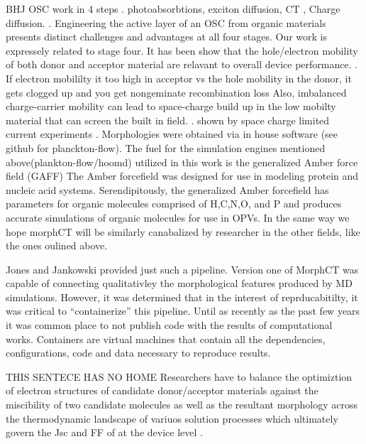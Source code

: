 BHJ OSC work in 4 steps . photoabsorbtions, exciton diffusion, CT , Charge diffusion. \citet{Fusella2019}.
Engineering the active layer of an OSC from organic materials presents distinct challenges and advantages at
all four stages. 
\indent Our work is expressely related to stage four. It has been show that the hole/electron mobility of both donor and acceptor material are
relavant to overall device performance. \cite{Wang2019e}. If electron mobililty it too high
in acceptor vs the hole mobility in the donor, it gets clogged up and you get nongeminate recombination loss
Also, imbalanced charge-carrier mobility can lead to space-charge build up in the low mobilty material that
can screen the built in field.  \cite{Bartelt2015}. shown by space charge limited current experiments
\cite{Small2013}.
Morphologies were obtained via in house software (see github for planckton-flow).  The
fuel for the simulation engines mentioned above(plankton-flow/hoomd) utilized in this work is the generalized
Amber force field (GAFF)\cite{Wang2004a} The Amber forcefield was designed for use in modeling protein and
nucleic acid systems.  Serendipitously, the generalized Amber forcefield has parameters for organic molecules
comprised of H,C,N,O, and P and produces accurate simulations of organic molecules for use in OPVs. In the
same way we hope morphCT will be similarly canabalized by researcher in the other fields, like the ones oulined above. 


\indent Jones and Jankowski provided just such a pipeline. Version one of MorphCT was capable of
connecting qualitativley the morphological features produced by MD simulations. However, it was determined
that in the interest of reprducabitilty, it was critical to ``containerize'' this pipeline. Until as recently as
the past few years it was common place to not publish code with the results of computational works. Containers
are virtual machines that contain all the dependencies, configurations, code and data necessary to reproduce
results. \cite{Cito2016a}

THIS SENTECE HAS NO HOME Researchers have to
balance the optimiztion of electron structures of candidate donor/acceptor materials against the miscibility
of two candidate molecules as well as the resultant morphology across the thermodynamic landscape of
variuos solution processes which ultimately govern the Jsc and FF of at the device level \cite{Zhu2020a}. 
